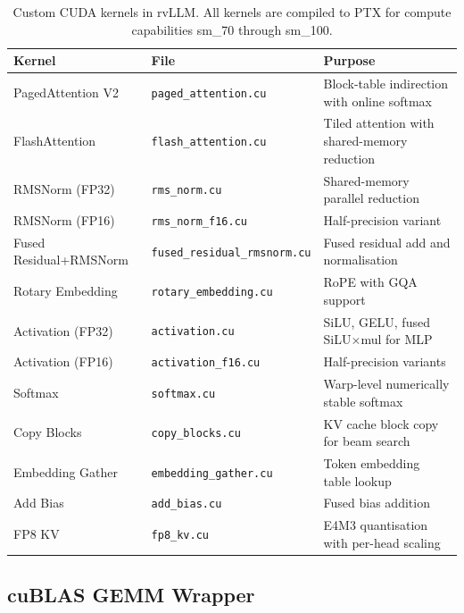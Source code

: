 \documentclass[11pt,a4paper]{article}
\newcommand{\thead}[1]{\textbf{\color{white}#1}}
\begin{document}
\begin{table}[t]
  \centering
  \caption{Custom CUDA kernels in rvLLM. All kernels are compiled to PTX for compute capabilities sm\_70 through sm\_100.}
  \label{tab:kernels}
  \small
  \begin{tabular}{@{}llp{5.5cm}@{}}
    \toprule
    \rowcolor{HeaderGray} \thead{Kernel} & \thead{File} & \thead{Purpose} \\
    \midrule
    PagedAttention V2 & \texttt{paged\_attention.cu} & Block-table indirection with online softmax \\
    \rowcolor{gray!8}
    FlashAttention    & \texttt{flash\_attention.cu} & Tiled attention with shared-memory reduction \\
    RMSNorm (FP32)    & \texttt{rms\_norm.cu}        & Shared-memory parallel reduction \\
    \rowcolor{gray!8}
    RMSNorm (FP16)    & \texttt{rms\_norm\_f16.cu}    & Half-precision variant \\
    Fused Residual+RMSNorm & \texttt{fused\_residual\_rmsnorm.cu} & Fused residual add and normalisation \\
    \rowcolor{gray!8}
    Rotary Embedding  & \texttt{rotary\_embedding.cu} & RoPE with GQA support \\
    Activation (FP32) & \texttt{activation.cu}       & SiLU, GELU, fused SiLU$\times$mul for MLP \\
    \rowcolor{gray!8}
    Activation (FP16) & \texttt{activation\_f16.cu}   & Half-precision variants \\
    Softmax           & \texttt{softmax.cu}          & Warp-level numerically stable softmax \\
    \rowcolor{gray!8}
    Copy Blocks       & \texttt{copy\_blocks.cu}      & KV cache block copy for beam search \\
    Embedding Gather  & \texttt{embedding\_gather.cu}  & Token embedding table lookup \\
    \rowcolor{gray!8}
    Add Bias          & \texttt{add\_bias.cu}         & Fused bias addition \\
    FP8 KV            & \texttt{fp8\_kv.cu}           & E4M3 quantisation with per-head scaling \\
    \bottomrule
  \end{tabular}
\end{table}

\subsection{cuBLAS GEMM Wrapper}
\end{document}
